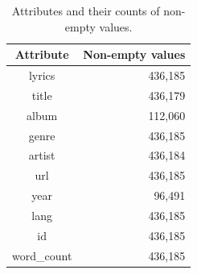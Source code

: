 \begin{table}[h!]
	\centering
	\begin{tabular}{| c | r |} 
		\hline
		Attribute & Non-empty values \\ [0.5ex] 
		\hline
		lyrics & 436,185 \\
		title & 436,179 \\
		album & 112,060 \\
		genre & 436,185 \\ 
		artist & 436,184 \\ 
		url & 436,185 \\
		year & 96,491 \\ 
		lang & 436,185 \\
		id & 436,185 \\
		word\_count & 436,185 \\
		\hline
	\end{tabular}
	\caption{Attributes and their counts of non-empty values.}
	\label{stats_nonempty_values}
\end{table}

